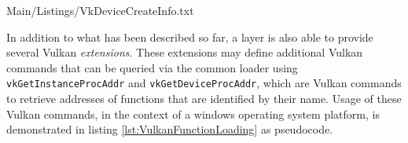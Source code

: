     
    {Main/Listings/VkDeviceCreateInfo.txt}

    In addition to what has been described so far, a layer is also able to provide several Vulkan \textit{extensions}. These extensions may define additional Vulkan commands that can be queried via the common loader using \lstinline{vkGetInstanceProcAddr} and \lstinline{vkGetDeviceProcAddr}, which are Vulkan commands to retrieve addresses of functions that are identified by their name. Usage of these Vulkan commands, in the context of a \gls{windows} operating system platform, is demonstrated in listing \ref{lst:VulkanFunctionLoading} as pseudocode.

